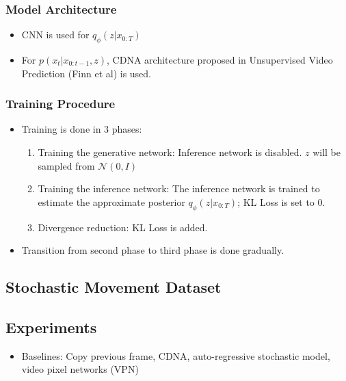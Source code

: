 \documentclass{article}
\begin{document}
    \subsubsection{Model Architecture}\label{subsubsec:Stochastic_Variational_Video_Prediction_(SV2P):model-architecture}
    \begin{itemize}
        \item CNN is used for $q_\phi(z|x_{0:T})$
        \item For $p(x_t | x_{0:t-1}, z)$, CDNA architecture proposed in Unsupervised Video Prediction (Finn et al) is used.
    \end{itemize}

    \subsubsection{Training Procedure}\label{subsubsec:Stochastic_Variational_Video_Prediction_(SV2P):training-procedure}
    \begin{itemize}
        \item Training is done in 3 phases:
        \begin{enumerate}
            \item Training the generative network: Inference network is disabled.
            $z$ will be sampled from $\mathcal{N}(0,I)$
            \item Training the inference network: The inference network is trained to estimate the approximate posterior $q_\phi(z | x_{0:T})$;
            KL Loss is set to 0.
            \item Divergence reduction: KL Loss is added.
        \end{enumerate}
        \item Transition from second phase to third phase is done gradually.
    \end{itemize}

    \subsection{Stochastic Movement Dataset}\label{subsec:Stochastic_Variational_Video_Prediction_(SV2P):stochastic-movement-dataset}

    \subsection{Experiments}\label{subsec:Stochastic_Variational_Video_Prediction_(SV2P):experiments}
    \begin{itemize}
        \item Baselines: Copy previous frame, CDNA, auto-regressive stochastic model, video pixel networks (VPN)
    \end{itemize}
\end{document}
